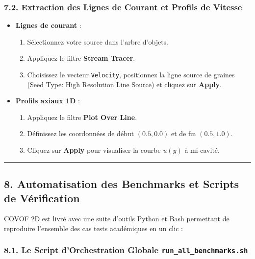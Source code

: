 \documentclass[
  french,
]{article}
\providecommand{\tightlist}{%
  \setlength{\itemsep}{0pt}\setlength{\parskip}{0pt}}
\begin{document}
\subsubsection{7.2. Extraction des Lignes de Courant et Profils de
Vitesse}\label{extraction-des-lignes-de-courant-et-profils-de-vitesse}

\begin{itemize}
\tightlist
\item
  \textbf{Lignes de courant} :

  \begin{enumerate}
  \def\labelenumi{\arabic{enumi}.}
  \tightlist
  \item
    Sélectionnez votre source dans l'arbre d'objets.
  \item
    Appliquez le filtre \textbf{Stream Tracer}.
  \item
    Choisissez le vecteur \texttt{Velocity}, positionnez la ligne source
    de graines (Seed Type: High Resolution Line Source) et cliquez sur
    \textbf{Apply}.
  \end{enumerate}
\item
  \textbf{Profils axiaux 1D} :

  \begin{enumerate}
  \def\labelenumi{\arabic{enumi}.}
  \tightlist
  \item
    Appliquez le filtre \textbf{Plot Over Line}.
  \item
    Définissez les coordonnées de début \((0.5, 0.0)\) et de fin
    \((0.5, 1.0)\).
  \item
    Cliquez sur \textbf{Apply} pour visualiser la courbe \(u(y)\) à
    mi-cavité.
  \end{enumerate}
\end{itemize}

\begin{center}\rule{0.5\linewidth}{0.5pt}\end{center}

\subsection{8. Automatisation des Benchmarks et Scripts de
Vérification}\label{automatisation-des-benchmarks-et-scripts-de-vuxe9rification}

COVOF 2D est livré avec une suite d'outils Python et Bash permettant de
reproduire l'ensemble des cas tests académiques en un clic :

\subsubsection{\texorpdfstring{8.1. Le Script d'Orchestration Globale
\texttt{run\_all\_benchmarks.sh}}{8.1. Le Script d'Orchestration Globale run\_all\_benchmarks.sh}}\label{le-script-dorchestration-globale-run_all_benchmarks.sh}
\end{document}
